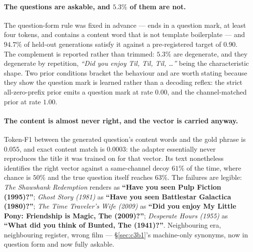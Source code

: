 \documentclass[11pt]{article}
\begin{document}
\paragraph{The questions are askable, and $5.3\%$ of them are not.} The question-form rule was fixed
in advance --- ends in a question mark, at least four tokens, and contains a content word that is not
template boilerplate --- and $94.7\%$ of held-out generations satisfy it against a pre-registered
target of $0.90$. The complement is reported rather than trimmed: $5.3\%$ are degenerate, and they
degenerate by repetition, \emph{``Did you enjoy Til, Til, Til, \ldots''} being the characteristic
shape. Two prior conditions bracket the behaviour and are worth stating because they show the
question mark is learned rather than a decoding reflex: the strict all-zero-prefix prior emits a
question mark at rate $0.00$, and the channel-matched prior at rate $1.00$.

\paragraph{The content is almost never right, and the vector is carried anyway.} Token-F1 between the
generated question's content words and the gold phrase is $\mathbf{0.055}$, and exact content match
is $\mathbf{0.0003}$: the adapter essentially never reproduces the title it was trained on for that
vector. Its text nonetheless identifies the right vector against a same-channel decoy $61\%$ of the
time, where chance is $50\%$ and the true question itself reaches $63\%$. The failures are legible:
\emph{The Shawshank Redemption} renders as \textbf{``Have you seen Pulp Fiction (1995)?''};
\emph{Ghost Story (1981)} as \textbf{``Have you seen Battlestar Galactica (1980)?''};
\emph{The Time Traveler's Wife (2009)} as \textbf{``Did you enjoy My Little Pony: Friendship is
Magic, The (2009)?''}; \emph{Desperate Hours (1955)} as \textbf{``What did you think of Bunted, The
(1941)?''}. Neighbouring era, neighbouring register, wrong film --- \S\ref{sec:c3b1}'s machine-only
synonyms, now in question form and now fully askable.
\end{document}
